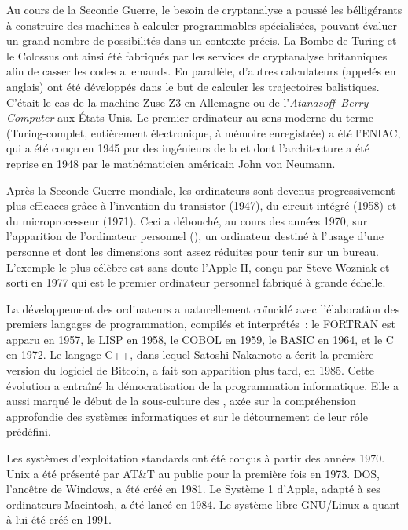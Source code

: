Au cours de la Seconde Guerre, le besoin de cryptanalyse a poussé les bélligérants à construire des machines à calculer programmables spécialisées, pouvant évaluer un grand nombre de possibilités dans un contexte précis. La Bombe de Turing et le Colossus ont ainsi été fabriqués par les services de cryptanalyse britanniques afin de casser les codes allemands. En parallèle, d'autres calculateurs (appelés  en anglais) ont été développés dans le but de calculer les trajectoires balistiques. C'était le cas de la machine Zuse Z3 en Allemagne ou de l'\emph{Atanasoff–Berry Computer} aux États-Unis. Le premier ordinateur au sens moderne du terme (Turing-complet, entièrement électronique, à mémoire enregistrée) a été l'ENIAC, qui a été conçu en 1945 par des ingénieurs de la  et dont l'architecture a été reprise en 1948 par le mathématicien américain John von Neumann.

Après la Seconde Guerre mondiale, les ordinateurs sont devenus progressivement plus efficaces grâce à l'invention du transistor (1947), du circuit intégré (1958) et du microprocesseur (1971). Ceci a débouché, au cours des années 1970, sur l'apparition de l'ordinateur personnel (), un ordinateur destiné à l'usage d'une personne et dont les dimensions sont assez réduites pour tenir sur un bureau. L'exemple le plus célèbre est sans doute l'Apple II, conçu par Steve Wozniak et sorti en 1977 qui est le premier ordinateur personnel fabriqué à grande échelle.

La développement des ordinateurs a naturellement coïncidé avec l'élaboration des premiers langages de programmation, compilés et interprétés~: le FORTRAN est apparu en 1957, le LISP en 1958, le COBOL en 1959, le BASIC en 1964, et le C en 1972. Le langage C++, dans lequel Satoshi Nakamoto a écrit la première version du logiciel de Bitcoin, a fait son apparition plus tard, en 1985. Cette évolution a entraîné la démocratisation de la programmation informatique. Elle a aussi marqué le début de la sous-culture des , axée sur la compréhension approfondie des systèmes informatiques et sur le détournement de leur rôle prédéfini. %

Les systèmes d'exploitation standards ont été conçus à partir des années 1970. Unix a été présenté par AT\&T au public pour la première fois en 1973. DOS, l'ancêtre de Windows, a été créé en 1981. Le Système 1 d'Apple, adapté à ses ordinateurs Macintosh, a été lancé en 1984. Le système libre GNU/Linux a quant à lui été créé en 1991.

